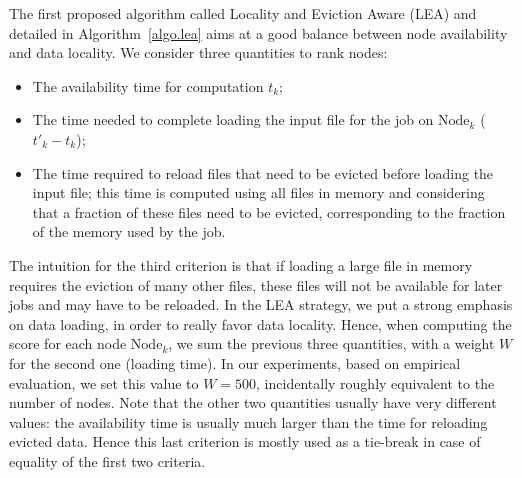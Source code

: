 \documentclass[conference,10pt]{IEEEtran}
\newcommand{\Node}[1]{\ensuremath{\mathrm{Node}_{#1}}\xspace}
\begin{document}

The first proposed algorithm called Locality and Eviction Aware (LEA)
and detailed in Algorithm~\ref{algo.lea} aims at a good balance
between node availability and data locality.  We consider three
quantities to rank nodes:
\begin{itemize}
\item The availability time for computation $t_k$;
\item The time needed to complete loading the input file for the job
  on \Node{k} ($t'_k - t_k$);
\item The time required to reload files that need to be evicted before
  loading the input file; this time is computed using all files in
  memory and considering that a fraction of these files need to be
  evicted, corresponding to the fraction of the memory used by the job.
\end{itemize}

The intuition for the third criterion is that if loading a large file
in memory requires the eviction of many other files, these files will not
be available for later jobs and may have to be reloaded.
In the LEA strategy, we put a strong emphasis on data loading, in order
to really favor data locality. Hence, when computing the score for
each node \Node{k}, we sum the previous three quantities, with a weight
$W$ for the second one (loading time). In our experiments, based on
empirical evaluation, we set this value to $W=500$, incidentally roughly
equivalent to the number of nodes.
Note that the other two quantities usually have very different values:
the availability time is usually much larger than the time for
reloading evicted data. Hence this last criterion is mostly used as a
tie-break in case of equality of the first two criteria.
\end{document}
